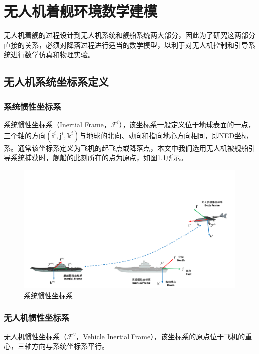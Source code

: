 \chapter{无人机着舰环境数学建模}
\label{chap:main}
无人机着舰的过程设计到无人机系统和舰船系统两大部分，因此为了研究这两部分直接的关系，必须对降落过程进行适当的数学模型\cite{beardsmall}，以利于对无人机控制和引导系统进行数学仿真和物理实验。

\section{无人机系统坐标系定义}


\subsection{系统惯性坐标系}
系统惯性坐标系（Inertial Frame，$\mathcal{F}^i$），该坐标系一般定义位于地球表面的一点，三个轴的方向$(\mathbf{i}^i, \mathbf{j}^i,\mathbf{k}^i)$与地球的北向、动向和指向地心方向相同，即NED坐标系。通常该坐标系定义为飞机的起飞点或降落点，本文中我们选用无人机被舰船引导系统捕获时，舰船的此刻所在的点为原点，如图\ref{fig:chp02_01_sys_interial_frame}所示。
\begin{figure}[htb]   
	\centering
	\includegraphics[width=\textwidth]{figs/chp02/chp02_01_sys_interial_frame.pdf}
	\caption{系统惯性坐标系}
	\label{fig:chp02_01_sys_interial_frame}
\end{figure}

\subsection{无人机惯性坐标系}
无人机惯性坐标系（$\mathcal{F}^v$，Vehicle Inertial Frame），该坐标系的原点位于飞机的重心，三轴方向与系统坐标系平行。

